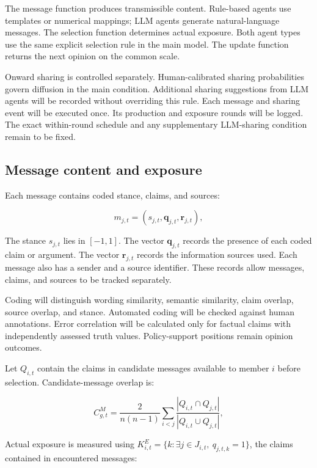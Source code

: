 \documentclass[11pt,a4paper]{article}
\begin{document}
The message function produces transmissible content. Rule-based agents use templates or numerical mappings; LLM agents generate natural-language messages. The selection function determines actual exposure. Both agent types use the same explicit selection rule in the main model. The update function returns the next opinion on the common scale.

Onward sharing is controlled separately. Human-calibrated sharing probabilities govern diffusion in the main condition. Additional sharing suggestions from LLM agents will be recorded without overriding this rule. Each message and sharing event will be executed once. Its production and exposure rounds will be logged. The exact within-round schedule and any supplementary LLM-sharing condition remain to be fixed.

\subsection{Message content and exposure}

Each message contains coded stance, claims, and sources:

\begin{equation*}
m_{j,t}
=
\left(
s_{j,t},
\mathbf q_{j,t},
\mathbf r_{j,t}
\right),
\end{equation*}

The stance $s_{j,t}$ lies in $[-1,1]$. The vector $\mathbf q_{j,t}$ records the presence of each coded claim or argument. The vector $\mathbf r_{j,t}$ records the information sources used. Each message also has a sender and a source identifier. These records allow messages, claims, and sources to be tracked separately.

Coding will distinguish wording similarity, semantic similarity, claim overlap, source overlap, and stance. Automated coding will be checked against human annotations. Error correlation will be calculated only for factual claims with independently assessed truth values. Policy-support positions remain opinion outcomes.

Let $Q_{i,t}$ contain the claims in candidate messages available to member $i$ before selection. Candidate-message overlap is:

\begin{equation*}
C^{M}_{g,t}
=
\frac{2}{n(n-1)}
\sum_{i<j}
\frac{|Q_{i,t}\cap Q_{j,t}|}
{|Q_{i,t}\cup Q_{j,t}|},
\end{equation*}

Actual exposure is measured using $K^{E}_{i,t}=\{k:\exists j\in J_{i,t},\ q_{j,t,k}=1\}$, the claims contained in encountered messages:
\end{document}
